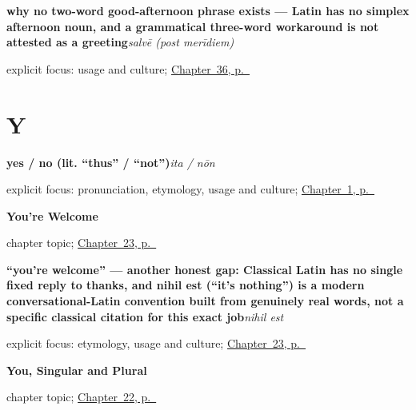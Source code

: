 \noindent\begin{minipage}[t]{\linewidth}
\raggedright
\textbf{why no two-word good-afternoon phrase exists — Latin has no simplex afternoon noun, and a grammatical three-word workaround is not attested as a greeting}\enspace\emph{salvē (post merīdiem)}\par
\footnotesize explicit focus: usage and culture; \hyperref[ch:la-good-afternoon]{Chapter~36, p.~\pageref*{ch:la-good-afternoon}}
\end{minipage}\par\smallskip

\section*{Y}

\noindent\begin{minipage}[t]{\linewidth}
\raggedright
\textbf{yes / no (lit. \textquotedblleft{}thus\textquotedblright{} / \textquotedblleft{}not\textquotedblright{})}\enspace\emph{ita / nōn}\par
\footnotesize explicit focus: pronunciation, etymology, usage and culture; \hyperref[ch:greetings]{Chapter~1, p.~\pageref*{ch:greetings}}
\end{minipage}\par\smallskip

\noindent\begin{minipage}[t]{\linewidth}
\raggedright
\textbf{You're Welcome}\par
\footnotesize chapter topic; \hyperref[ch:la-youre-welcome]{Chapter~23, p.~\pageref*{ch:la-youre-welcome}}
\end{minipage}\par\smallskip

\noindent\begin{minipage}[t]{\linewidth}
\raggedright
\textbf{\textquotedblleft{}you're welcome\textquotedblright{} — another honest gap: Classical Latin has no single fixed reply to thanks, and nihil est (\textquotedblleft{}it's nothing\textquotedblright{}) is a modern conversational-Latin convention built from genuinely real words, not a specific classical citation for this exact job}\enspace\emph{nihil est}\par
\footnotesize explicit focus: etymology, usage and culture; \hyperref[ch:la-youre-welcome]{Chapter~23, p.~\pageref*{ch:la-youre-welcome}}
\end{minipage}\par\smallskip

\noindent\begin{minipage}[t]{\linewidth}
\raggedright
\textbf{You, Singular and Plural}\par
\footnotesize chapter topic; \hyperref[ch:la-you-singular-plural]{Chapter~22, p.~\pageref*{ch:la-you-singular-plural}}
\end{minipage}\par\smallskip

